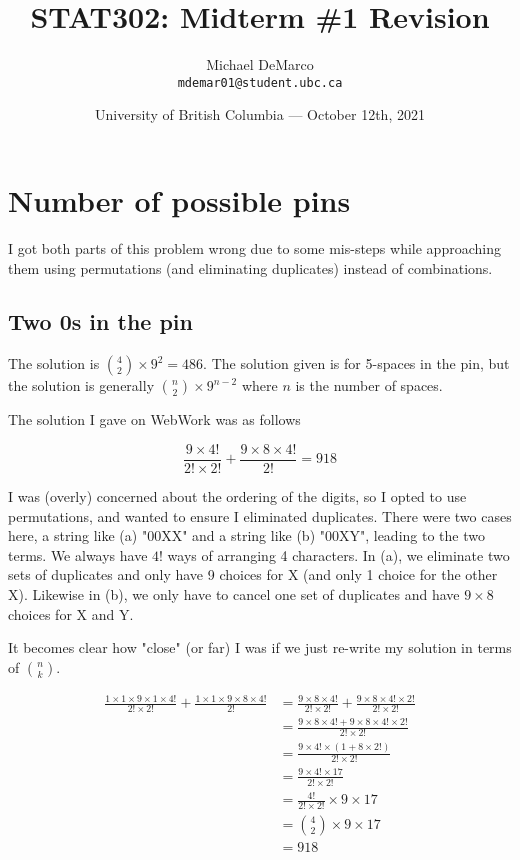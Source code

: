 \documentclass{article}
\title{STAT302: Midterm \#1 Revision}
\author{Michael DeMarco\\ \texttt{mdemar01@student.ubc.ca}}
\date{University of British Columbia --- October 12th, 2021}
\begin{document}
\maketitle %

\section{Number of possible pins}

I got both parts of this problem wrong due to some mis-steps while approaching them using permutations (and eliminating duplicates) instead of combinations.

\subsection{Two 0s in the pin}

The solution is $\binom{4}{2} \times 9^2 = 486$. The solution given is for 5-spaces in the pin, but the solution is generally $\binom{n}{2} \times 9^{n-2}$ where $n$ is the number of spaces.

The solution I gave on WebWork was as follows

$$\frac{9\times4!}{2!\times2!} + \frac{9\times8\times4!}{2!} = 918$$

I was (overly) concerned about the ordering of the digits, so I opted to use permutations, and wanted to ensure I eliminated duplicates. There were two cases here, a string like (a) "00XX" and a string like (b) "00XY", leading to the two terms. We always have $4!$ ways of arranging 4 characters. In (a), we eliminate two sets of duplicates and only have 9 choices for X (and only 1 choice for the other X). Likewise in (b), we only have to cancel one set of duplicates and have $9 \times 8$ choices for X and Y.

It becomes clear how "close" (or far) I was if we just re-write my solution in terms of $\binom{n}{k}$.

\begin{equation}
	\begin{split}
		\frac{1\times1\times9\times1\times4!}{2!\times2!} + \frac{1\times1\times9\times8\times4!}{2!} & = \frac{9\times8\times4!}{2!\times2!} + \frac{9\times8\times4!\times2!}{2!\times2!} \\
		& = \frac{9\times8\times4! + 9\times8\times4!\times2!}{2!\times2!} \\
		& = \frac{9\times4!\times(1 + 8\times2!)}{2!\times2!} \\
		& = \frac{9\times4!\times17}{2!\times2!} \\
		& = \frac{4!}{2!\times2!}\times9\times17 \\
		& = \binom{4}{2}\times9\times17\\
		& = 918
	\end{split}
\end{equation}
\end{document}
